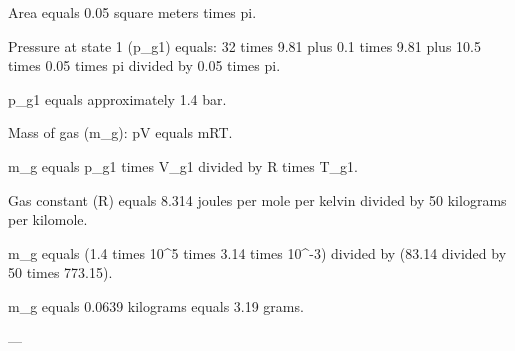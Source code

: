 Area equals 0.05 square meters times pi.  

Pressure at state 1 (p_g1) equals:  
32 times 9.81 plus 0.1 times 9.81 plus 10.5 times 0.05 times pi divided by 0.05 times pi.  

p_g1 equals approximately 1.4 bar.  

Mass of gas (m_g):  
pV equals mRT.  

m_g equals p_g1 times V_g1 divided by R times T_g1.  

Gas constant (R) equals 8.314 joules per mole per kelvin divided by 50 kilograms per kilomole.  

m_g equals (1.4 times 10^5 times 3.14 times 10^-3) divided by (83.14 divided by 50 times 773.15).  

m_g equals 0.0639 kilograms equals 3.19 grams.  

---